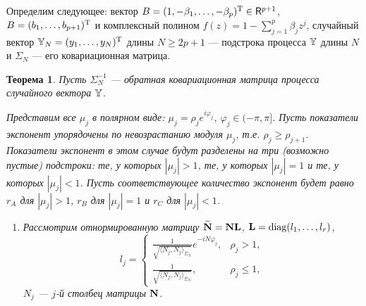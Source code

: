 \documentclass[12pt,a4paper]{article}
\def\diag{\mathop{\mathrm{diag}}}
\newtheorem{theorem}{Теорема}
\begin{document}
Определим следующее: вектор $B = (1, -\beta_1, \ldots, -\beta_p)^{\mathrm{T}} \in \mathsf{R}^{p+1}$, $B = (b_1, \ldots, b_{p+1})^{\mathrm{T}}$ и комплексный полином $f(z) = 1 - \sum_{j=1}^p \beta_j z^j$, случайный вектор $\mathbb{Y}_N = (y_1, \ldots, y_N)^{\mathrm{T}}$ длины $N \ge 2p + 1$ --- подстрока процесса $\mathbb{Y}$ длины $N$ и $\Sigma_N$ --- его ковариационная матрица.

\begin{theorem} \label{th:arinconsistency}
	Пусть $\Sigma_N^{-1}$ --- обратная ковариационная матрица процесса случайного вектора $\mathbb{Y}$.
	
	Представим все $\mu_j$ в полярном виде: $\mu_j = \rho_j e^{i \varphi_j}$, $\varphi_j \in (-\pi, \pi]$. Пусть показатели экспонент упорядочены по невозрастанию модуля $\mu_j$, т.е. $\rho_j \ge \rho_{j+1}$. Показатели экспонент в этом случае будут разделены на три (возможно пустые) подстроки: те, у которых $|\mu_j|>1$, те, у которых $|\mu_j| = 1$ и те, у которых $|\mu_j| < 1$. Пусть соответствующее количество экспонент будет равно $r_A$ для $|\mu_j|>1$, $r_B$ для $|\mu_j|=1$ и $r_C$ для $|\mu_j|<1$.
	\begin{enumerate}
		\item Рассмотрим отнормированную матрицу $\widetilde {\mathbf{N}} = \mathbf{N} \mathbf{L}$, $\bfL = \diag(l_1, \ldots, l_r)$, 
		\begin{equation*}
		l_j = \begin{cases}
		\frac{1}{\sqrt{\langle N_j, N_j \rangle_{\Sigma_N}}} e^{-i N \varphi_j}, & \rho_j > 1, \\
		\frac{1}{\sqrt{\langle N_j, N_j \rangle_{\Sigma_N}}}, & \rho_j \le 1,
		\end{cases}
		\end{equation*}
		$N_j$ --- $j$-й столбец матрицы $\mathbf{N}$.
		

\end{enumerate}
\end{theorem}
\end{document}
